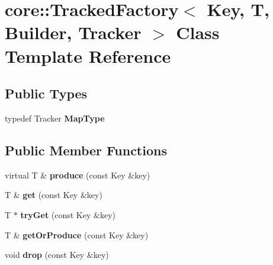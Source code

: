 \hypertarget{classcore_1_1_tracked_factory}{\section{core\-:\-:Tracked\-Factory$<$ Key, T, Builder, Tracker $>$ Class Template Reference}
\label{classcore_1_1_tracked_factory}
}
\subsection*{Public Types}
\begin{DoxyCompactItemize}
\item 
\hypertarget{classcore_1_1_tracked_factory_a9a0bc86c613dea8c39c836b48c10e087}{typedef Tracker {\bfseries Map\-Type}}\label{classcore_1_1_tracked_factory_a9a0bc86c613dea8c39c836b48c10e087}

\end{DoxyCompactItemize}
\subsection*{Public Member Functions}
\begin{DoxyCompactItemize}
\item 
\hypertarget{classcore_1_1_tracked_factory_aea531a612ef7eb2a1e5ecdc16c55ebf6}{virtual T \& {\bfseries produce} (const Key \&key)}\label{classcore_1_1_tracked_factory_aea531a612ef7eb2a1e5ecdc16c55ebf6}

\item 
\hypertarget{classcore_1_1_tracked_factory_a3bb8e379860b76e05e07dfd9bedd325b}{T \& {\bfseries get} (const Key \&key)}\label{classcore_1_1_tracked_factory_a3bb8e379860b76e05e07dfd9bedd325b}

\item 
\hypertarget{classcore_1_1_tracked_factory_a3c235e450261143e0e10bb74cf144a35}{T $\ast$ {\bfseries try\-Get} (const Key \&key)}\label{classcore_1_1_tracked_factory_a3c235e450261143e0e10bb74cf144a35}

\item 
\hypertarget{classcore_1_1_tracked_factory_a193a13685ed88c5bd9d82f747dbb626b}{T \& {\bfseries get\-Or\-Produce} (const Key \&key)}\label{classcore_1_1_tracked_factory_a193a13685ed88c5bd9d82f747dbb626b}

\item 
\hypertarget{classcore_1_1_tracked_factory_a9c375740bae48f88293d19ea64211cab}{void {\bfseries drop} (const Key \&key)}\label{classcore_1_1_tracked_factory_a9c375740bae48f88293d19ea64211cab}

\end{DoxyCompactItemize}
